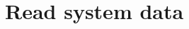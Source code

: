 \section{Read system data} \label{sec:ReadSystemData}




\begin{comment} %
In the pseudocodes, the following are used:
\begin{itemize}
  \item \ttb{blue} \ldots variable that is a parameter of the described
    function
  \item $italics$ \ldots \ variable defined within the described function
  \item square brackets with a variable means the variable is an array (with
    number of elements corresponding to what is inside the brackets)
  \item \hltt{high[light]} \ldots \ literal string (square brackets denote
    optional part of the string, i.e., only \hltt{high} would be looked for in
    this example)
  \item \textsc{SmallCaps} \ldots \ function call to a function not described
    within the manual
  \item \textsc{\textcolor{red}{RedSmallCaps}} \ldots \ function call
    referencing to a section with the called function
  \item \textbf{error} keyword \ldots \ exit a program with an error
  \item the triangle represent a short comment, while comments describing a
    whole section of the function are line-separated from the pseudocode
\end{itemize}
The following are rules for some common actions (unless stated otherwise in the
pseudocode):
\begin{itemize}
  \item reading a line from a file is usually done using
    \textsc{ReadAndSplitLine} function from \tt{General} library; this function:
    \begin{enumerate}
      \item reads at most 1023 characters of line, discarding the rest of the
        line
      \item splits the line into individual whitespace-separated strings using
        the \textsc{SplitLine} function from \tt{General} libreary; at most 31
        strings are created, each at most 63 characters long

\end{comment}
